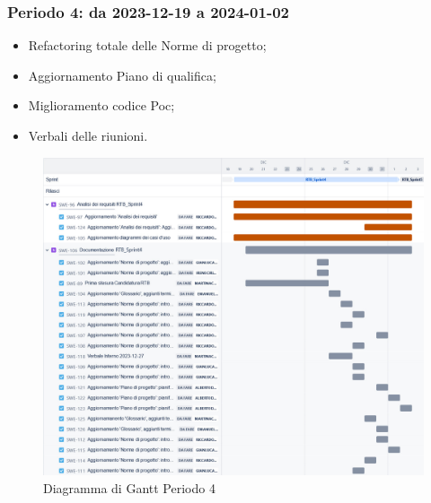 \documentclass[10pt, a4paper]{article}
\begin{document}
\subsubsection{Periodo 4: da 2023-12-19 a 2024-01-02}
\begin{itemize}
    \item Refactoring totale delle Norme di progetto;
    \item Aggiornamento Piano di qualifica;
    \item Miglioramento codice Poc;
    \item Verbali delle riunioni.
\end{itemize}
\begin{figure}[H]
    \centering        
    \includegraphics[width=15.5cm]{gantt/ganttPeriodo4.png}
    \caption{Diagramma di Gantt Periodo 4}
\end{figure}
\end{document}
